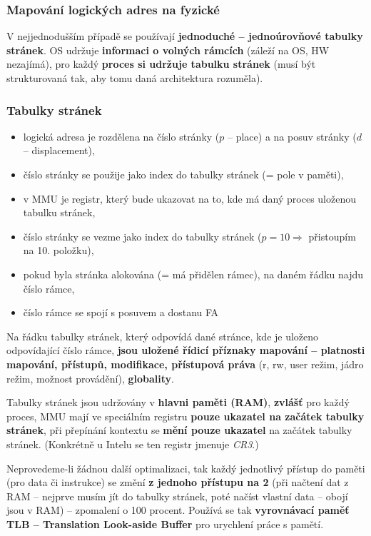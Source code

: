 \documentclass[a4paper, 11pt]{article}
\begin{document}
\subsubsection{Mapování logických adres na fyzické}
V nejjednodušším případě se používají \textbf{jednoduché -- jednoúrovňové tabulky stránek}. OS udržuje \textbf{informaci o volných rámcích} (záleží na OS, HW nezajímá), pro každý \textbf{proces si udržuje tabulku stránek} (musí být strukturovaná tak, aby tomu daná architektura rozuměla).
 
\subsubsection{Tabulky stránek}
\begin{itemize}
    \item logická adresa je rozdělena na číslo stránky ($p$ -- place) a na posuv stránky ($d$ -- displacement),
    \item číslo stránky se použije jako index do tabulky stránek (= pole v paměti),
    \item v MMU je registr, který bude ukazovat na to, kde má daný proces uloženou tabulku stránek,
    \item číslo stránky se vezme jako index do tabulky stránek ($p=10 \Rightarrow$ přistoupím na 10. položku),
    \item pokud byla stránka alokována (= má přidělen rámec), na daném řádku najdu číslo rámce,
    \item číslo rámce se spojí s posuvem a dostanu FA
\end{itemize}
 
Na řádku tabulky stránek, který odpovídá dané stránce, kde je uloženo odpovídající číslo rámce, \textbf{jsou uložené řídicí příznaky mapování -- platnosti mapování, přístupů, modifikace, přístupová práva} (r, rw, user režim, jádro režim, možnost provádění), \textbf{globality}.
 
Tabulky stránek jsou udržovány v \textbf{hlavni paměti (RAM)}, \textbf{zvlášť} pro každý proces, MMU mají ve speciálním registru \textbf{pouze ukazatel na začátek tabulky stránek}, při přepínání kontextu se \textbf{mění pouze ukazatel} na začátek tabulky stránek. (Konkrétně u Intelu se ten registr jmenuje \emph{CR3}.)
 
Neprovedeme-li žádnou další optimalizaci, tak každý jednotlivý přístup do paměti (pro data či instrukce) se změní \textbf{z jednoho přístupu na 2} (při načtení dat z RAM -- nejprve musím jít do tabulky stránek, poté načíst vlastní data -- obojí jsou v RAM) -- zpomalení o 100 procent. Používá se tak \textbf{vyrovnávací paměť TLB -- Translation Look-aside Buffer} pro urychlení práce s pamětí.
\end{document}
